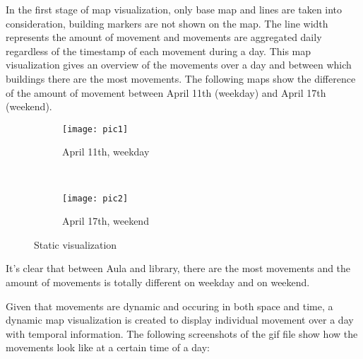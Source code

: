 In the first stage of map visualization, only base map and lines are taken into consideration, building markers are not shown on the map. The line width represents the amount of movement and movements are aggregated daily regardless of the timestamp of each movement during a day. This map visualization gives an overview of the movements over a day and between which buildings there are the most movements. The following maps show the difference of the amount of movement between April 11th (weekday) and April 17th (weekend).

\begin{figure}[H]
\captionsetup[subfigure]{justification=centering}
    \centering
    \begin{subfigure}[t]{0.5\textwidth}
        \centering
        \texttt{[image: pic1]}
        \caption{April 11th, weekday}
    \end{subfigure}%
    ~ 
    \begin{subfigure}[t]{0.5\textwidth}
        \centering
        \texttt{[image: pic2]}
        \caption{April 17th, weekend}
    \end{subfigure}
    \captionsetup{justification=centering}
    \caption{Static visualization}
    \label{staticvisualization}
\end{figure}

It's clear that between Aula and library, there are the most movements and the amount of movements is totally different on weekday and on weekend.

Given that movements are dynamic and occuring in both space and time, a dynamic map visualization is created to display individual movement over a day with temporal information. The following screenshots of the gif file show how the movements look like at a certain time of a day:

